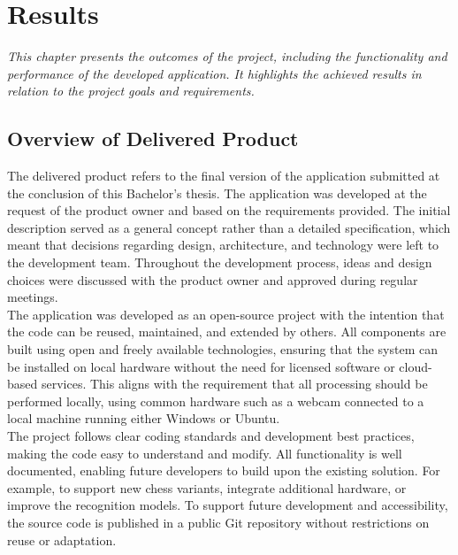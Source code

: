 \chapter{Results}

\begin{center}
    \textit{This chapter presents the outcomes of the project, including the functionality and performance of the developed application. It highlights the achieved results in relation to the project goals and requirements.}
\end{center}

\section{Overview of Delivered Product}
The delivered product refers to the final version of the application submitted at the conclusion of this Bachelor’s thesis. The application was developed at the request of the product owner and based on the requirements provided. The initial description served as a general concept rather than a detailed specification, which meant that decisions regarding design, architecture, and technology were left to the development team. Throughout the development process, ideas and design choices were discussed with the product owner and approved during regular meetings. \\

The application was developed as an open-source project with the intention that the code can be reused, maintained, and extended by others. All components are built using open and freely available technologies, ensuring that the system can be installed on local hardware without the need for licensed software or cloud-based services. This aligns with the requirement that all processing should be performed locally, using common hardware such as a webcam connected to a local machine running either Windows or Ubuntu. \\

The project follows clear coding standards and development best practices, making the code easy to understand and modify. All functionality is well documented, enabling future developers to build upon the existing solution. For example, to support new chess variants, integrate additional hardware, or improve the recognition models. To support future development and accessibility, the source code is published in a public Git repository without restrictions on reuse or adaptation. \\

